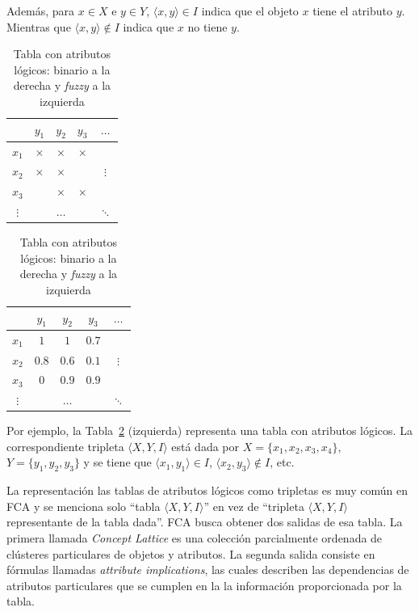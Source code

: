 \documentclass[12pt,oneside,letterpaper]{book}
\newcommand{\eng}[1]{\textit{#1}\xspace}			%
\newcommand{\abr}[1]{\textsc{#1}\xspace}           %
\theoremstyle{definition}
\begin{document}
Además, para $x \in X$ e $y \in Y$, $\langle x,y\rangle \in I$ indica que el objeto $x$ tiene el atributo $y$. Mientras que $\langle x,y \rangle \notin I$ indica que $x$ no tiene $y$.

\clearpage

\begin{table}[h!]
	\centering
	\begin{minipage}[b]{0.49\textwidth}
		\begin{tabular}{|c|cccc|}
			\hline
				  & $y_1$	 & $y_2$ 	& $y_3$	   & $\dots$ \\
			\hline
			$x_1$ & $\times$ & $\times$ & $\times$ & 		  \\
			$x_2$ & $\times$ & $\times$ & 		   & $\vdots$ \\
			$x_3$ & 		 & $\times$ & $\times$ & 		  \\
			$\vdots$ & 		 & $\dots$	& 		   & $\ddots$ \\
			\hline		 	
		\end{tabular}
	\end{minipage}
	\begin{minipage}[b]{0.49\textwidth}
		\begin{tabular}{|c|cccc|}
			\hline
					 & $y_1$ & $y_2$   	& $y_3$ & $\dots$	\\
			\hline
			$x_1$	 & $1$ 	 & $1$	 	& $0.7$ & 			\\
			$x_2$	 & $0.8$ & $0.6$ 	& $0.1$ & $\vdots$	\\
			$x_3$	 & $0$	 & $0.9$ 	& $0.9$ & 			\\
			$\vdots$ & 		 & $\dots$	& 		& $\ddots$ 	\\
			\hline		 	
		\end{tabular}
	\end{minipage}
	\caption{Tabla con atributos lógicos: binario a la derecha y \eng{fuzzy} a la izquierda}
	\label{tbl:table_logical_attributes}
\end{table}

Por ejemplo, la Tabla~\ref{tbl:table_logical_attributes} (izquierda) representa una tabla con atributos lógicos. La correspondiente tripleta $\langle X,Y,I \rangle$ está dada por $X = \{x_1,x_2,x_3, x_4\}$, $Y = \{y_1,y_2,y_3\}$ y se tiene que $\langle x_1,y_1 \rangle \in I$, $\langle x_2,y_3 \rangle \notin I$, etc.

La representación las tablas de atributos lógicos como tripletas es muy común en \abr{FCA} y se menciona solo ``tabla $\langle X,Y,I \rangle$'' en vez de ``tripleta $\langle X,Y,I \rangle$ representante de la tabla dada''. \abr{FCA} busca obtener dos salidas de esa tabla. La primera llamada \eng{Concept Lattice} es una colección parcialmente ordenada de clústeres particulares de objetos y atributos. La segunda salida consiste en fórmulas llamadas \eng{attribute implications}, las cuales describen las dependencias de atributos particulares que se cumplen en la la información proporcionada por la tabla.
\end{document}
